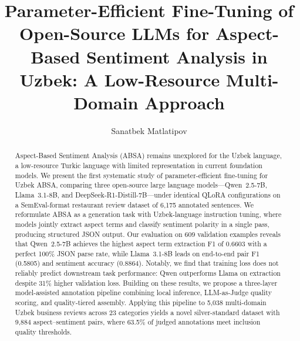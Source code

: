 \documentclass[runningheads]{llncs}
\begin{document}
\title{Parameter-Efficient Fine-Tuning of Open-Source LLMs
for Aspect-Based Sentiment Analysis in Uzbek:
A Low-Resource Multi-Domain Approach}

\author{Sanatbek Matlatipov}
%
%

\maketitle

\begin{abstract}
Aspect-Based Sentiment Analysis (ABSA) remains unexplored for the Uzbek language, a low-resource Turkic language with limited representation in current foundation models. We present the first systematic study of parameter-efficient fine-tuning for Uzbek ABSA, comparing three open-source large language models---Qwen~2.5-7B, Llama~3.1-8B, and DeepSeek-R1-Distill-7B---under identical QLoRA configurations on a SemEval-format restaurant review dataset of 6{,}175 annotated sentences. We reformulate ABSA as a generation task with Uzbek-language instruction tuning, where models jointly extract aspect terms and classify sentiment polarity in a single pass, producing structured JSON output. Our evaluation on 609 validation examples reveals that Qwen~2.5-7B achieves the highest aspect term extraction F1 of 0.6603 with a perfect 100\% JSON parse rate, while Llama~3.1-8B leads on end-to-end pair F1 (0.5805) and sentiment accuracy (0.8864). Notably, we find that training loss does not reliably predict downstream task performance: Qwen outperforms Llama on extraction despite 31\% higher validation loss. Building on these results, we propose a three-layer model-assisted annotation pipeline combining local inference, LLM-as-Judge quality scoring, and quality-tiered assembly. Applying this pipeline to 5{,}038 multi-domain Uzbek business reviews across 23 categories yields a novel silver-standard dataset with 9{,}884 aspect--sentiment pairs, where 63.5\% of judged annotations meet inclusion quality thresholds.

\end{abstract}
\end{document}
